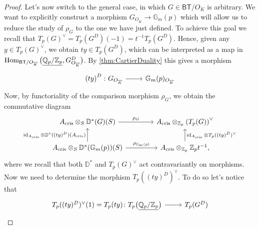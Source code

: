 \begin{proof}
	Let's now switch to the general case, in which $G \in \mathsf{BT}/O_K$
	is arbitrary.
	We want to explicitly construct a morphism $G_{O_{\overline{K}}} \to \mathbb{G}_m(p)$
	which will allow us to reduce the study of $\rho_G$ to the one we have just defined.
	To achieve this goal we recall that $T_p(G)^\vee = T_p(G^D)(-1) = t^{-1}T_p(G^D)$.
	Hence, given any $y \in T_p(G)^\vee$, we obtain $ty \in T_p(G^D)$,
	which can be interpreted as a map in 
	$\operatorname{Hom}_{ \mathsf{BT}/O_{\overline{K}} } 
	\big( \underline{\mathbb{Q}_p/\mathbb{Z}_{p}}, G^D_{O_{\overline{K}}}\big)$.
	By \cref{thm:CartierDuality} this gives a morphism
	\begin{equation*}
	\begin{tikzcd}[row sep = 0ex
		,/tikz/column 1/.append style={anchor=base east}
		,/tikz/column 2/.append style={anchor=base west}]
		\left( ty \right)^D\colon G_{O_{\overline{K}}}
		\arrow[r, "", rightarrow] &
		\mathbb{G}_m(p)_{O_{\overline{K}}}
	\end{tikzcd}
	\end{equation*} 
	Now, by functoriality of the comparison morphism $\rho_G$, we obtain the commutative
	diagram
	\begin{equation*}
	\begin{tikzcd}[column sep=4.0em]
		A_{\mathrm{cris}} \otimes_S \mathbb{D}^*(G)(S)
		\arrow[r, "\rho_G", rightarrow] &
		A_{\mathrm{cris}} \otimes_{\mathbb{Z}_{p}} \left( T_p(G) \right)^\vee \\
		A_{\mathrm{cris}} \otimes_S \mathbb{D}^*(\mathbb{G}_m(p))(S)
		\arrow[r, "\rho_{\mathbb{G}_m(p)}", rightarrow] 
		\arrow[u, "\id_{ A_{\mathrm{cris}} } \otimes \mathbb{D}^*((ty)^D)(A_{\mathrm{cris}})", rightarrow] &
		A_{\mathrm{cris}} \otimes_{\mathbb{Z}_{p}} \mathbb{Z}_{p} t^{-1}
		\arrow[u, "\id_{ A_{\mathrm{cris}} } \otimes T_p ((ty)^D)^\vee"', rightarrow] 
	,\end{tikzcd}
	\end{equation*}
	where we recall that both $\mathbb{D}^*$ and $T_p(G)^\vee$ act contravariantly on morphisms.
	Now we need to determine the morphism $T_p((ty)^D)^\vee$. %
	To do so let's notice that 
	\begin{equation*}
	\begin{tikzcd}[row sep = 0ex
		,/tikz/column 1/.append style={anchor=base east}
		,/tikz/column 2/.append style={anchor=base west}]
		T_p((ty)^D)^\vee(1) = T_p(ty)\colon 
		T_p \big( \underline{\mathbb{Q}_p/\mathbb{Z}_{p}} \big)
		\arrow[r, "", rightarrow] &
		T_p(G^D)\\

\end{tikzcd}
\end{equation*}
\end{proof}
